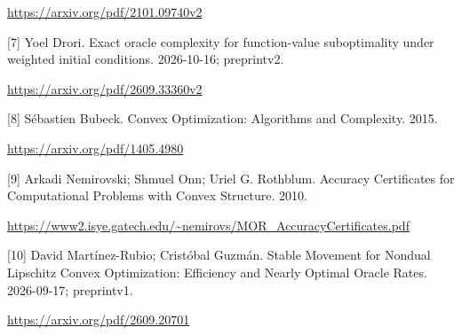 \documentclass[10pt,a4paper]{article}
\begin{document}
\url{https://arxiv.org/pdf/2101.09740v2}

[7] Yoel Drori. Exact oracle complexity for function-value suboptimality under weighted initial conditions. 2026-10-16; preprintv2.

\url{https://arxiv.org/pdf/2609.33360v2}

[8] Sébastien Bubeck. Convex Optimization: Algorithms and Complexity. 2015.

\url{https://arxiv.org/pdf/1405.4980}

[9] Arkadi Nemirovski; Shmuel Onn; Uriel G. Rothblum. Accuracy Certificates for Computational Problems with Convex Structure. 2010.

\url{https://www2.isye.gatech.edu/~nemirovs/MOR_AccuracyCertificates.pdf}

[10] David Martínez-Rubio; Cristóbal Guzmán. Stable Movement for Nondual Lipschitz Convex Optimization: Efficiency and Nearly Optimal Oracle Rates. 2026-09-17; preprintv1.

\url{https://arxiv.org/pdf/2609.20701}
\end{document}
